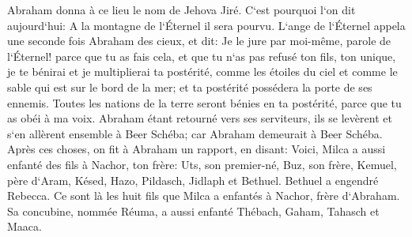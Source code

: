 \verse Abraham donna à ce lieu le nom de Jehova Jiré. C`est pourquoi l`on dit aujourd`hui: A la montagne de l`Éternel il sera pourvu. 
\verse L`ange de l`Éternel appela une seconde fois Abraham des cieux, 
\verse et dit: Je le jure par moi-même, parole de l`Éternel! parce que tu as fais cela, et que tu n`as pas refusé ton fils, ton unique, 
\verse je te bénirai et je multiplierai ta postérité, comme les étoiles du ciel et comme le sable qui est sur le bord de la mer; et ta postérité possédera la porte de ses ennemis. 
\verse Toutes les nations de la terre seront bénies en ta postérité, parce que tu as obéi à ma voix. 
\verse Abraham étant retourné vers ses serviteurs, ils se levèrent et s`en allèrent ensemble à Beer Schéba; car Abraham demeurait à Beer Schéba. 
\verse Après ces choses, on fit à Abraham un rapport, en disant: Voici, Milca a aussi enfanté des fils à Nachor, ton frère: 
\verse Uts, son premier-né, Buz, son frère, Kemuel, père d`Aram, 
\verse Késed, Hazo, Pildasch, Jidlaph et Bethuel. 
\verse Bethuel a engendré Rebecca. Ce sont là les huit fils que Milca a enfantés à Nachor, frère d`Abraham. 
\verse Sa concubine, nommée Réuma, a aussi enfanté Thébach, Gaham, Tahasch et Maaca. 

